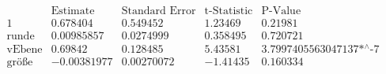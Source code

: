 \[\begin{array}{l|llll}
 \text{} & \text{Estimate} & \text{Standard Error} & \text{t-Statistic} & \text{P-Value} \\
\hline
 1 & 0.678404 & 0.549452 & 1.23469 & 0.21981 \\
 \text{runde} & 0.00985857 & 0.0274999 & 0.358495 & 0.720721 \\
 \text{vEbene} & 0.69842 & 0.128485 & 5.43581 & \text{3.7997405563047137$\grave{ }$*${}^{\wedge}$-7} \\
 \text{gr{\" o}{\ss}e} & -0.00381977 & 0.00270072 & -1.41435 & 0.160334 \\
\end{array}\]

